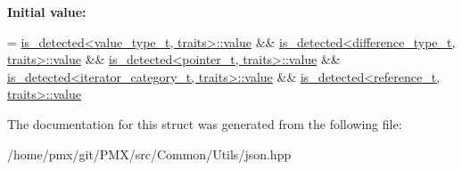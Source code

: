 {\bfseries Initial value\+:}
\begin{DoxyCode}
=
        \hyperlink{namespacenlohmann_1_1detail_a59e696b1dad6d0d99c172ac4518c2042a2063c1608d6e0baf80249c42e2be5804}{is\_detected<value\_type\_t, traits>::value} &&
        \hyperlink{namespacenlohmann_1_1detail_a59e696b1dad6d0d99c172ac4518c2042a2063c1608d6e0baf80249c42e2be5804}{is\_detected<difference\_type\_t, traits>::value} &&
        \hyperlink{namespacenlohmann_1_1detail_a59e696b1dad6d0d99c172ac4518c2042a2063c1608d6e0baf80249c42e2be5804}{is\_detected<pointer\_t, traits>::value} &&
        \hyperlink{namespacenlohmann_1_1detail_a59e696b1dad6d0d99c172ac4518c2042a2063c1608d6e0baf80249c42e2be5804}{is\_detected<iterator\_category\_t, traits>::value} &&
        \hyperlink{namespacenlohmann_1_1detail_a59e696b1dad6d0d99c172ac4518c2042a2063c1608d6e0baf80249c42e2be5804}{is\_detected<reference\_t, traits>::value}
\end{DoxyCode}


The documentation for this struct was generated from the following file\+:\begin{DoxyCompactItemize}
\item 
/home/pmx/git/\+P\+M\+X/src/\+Common/\+Utils/json.\+hpp\end{DoxyCompactItemize}
